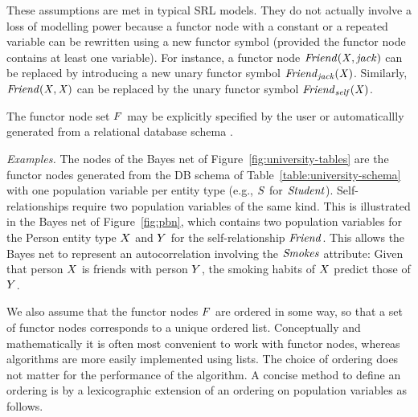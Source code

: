 These assumptions are met in typical SRL models. They do not actually involve a loss of modelling power because a functor node with a constant or a repeated variable can be rewritten using a new functor symbol (provided the functor node contains at least one variable). For instance, a functor node $\it{Friend}(\X,\it{jack})$ can be replaced by introducing a new unary functor symbol $\it{Friend}_{\it{jack}}(\X)$. %
Similarly, $\it{Friend}(\X,\X)$ can be replaced by the unary functor symbol $\it{Friend}_{\it{self}}(\X)$.

The functor node set $\F$ may be explicitly specified by the user or automaticallly generated from a relational database schema \cite{Khosravi2010}.

{\em Examples.} The nodes of the Bayes net of Figure~\ref{fig:university-tables} are the functor nodes generated from the DB schema of Table~\ref{table:university-schema} with one population variable per entity type (e.g., $\S$ for $\it{Student}$). Self-relationships require two population variables of the same kind. This is illustrated in the Bayes net of Figure~\ref{fig:pbn}, which contains two population variables for the Person entity type $\X$ and $\Y$ for the self-relationship $\it{Friend}$. This allows the Bayes net to represent an autocorrelation involving the $\it{Smokes}$ attribute: Given that person $\X$ is friends with person $\Y$, the smoking habits of $\X$ predict those of $\Y$. 

We also assume that the functor nodes $\F$ are ordered in some way, so that a set of functor nodes corresponds to a unique ordered list. Conceptually and mathematically it is often most convenient to work with functor nodes, whereas algorithms are more easily implemented using lists. The choice of ordering does not matter for the performance of the algorithm. A concise method to define an ordering is by a lexicographic extension of an ordering on population variables as follows.

